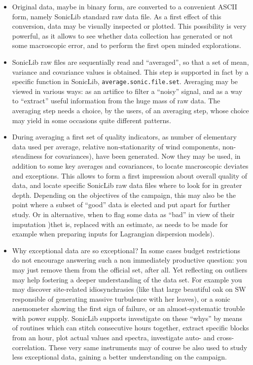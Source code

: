 \documentclass[a4paper,10pt]{book}
\begin{document}
\begin{itemize}
 \item Original data, maybe in binary form, are converted to a convenient ASCII form, namely SonicLib standard raw data file. As a first effect of this conversion, data may be visually inspected or plotted. This possibility is very powerful, as it allows to see whether data collection has generated or not some macroscopic error, and to perform the first open minded explorations.
 \item SonicLib raw files are sequentially read and ``averaged'', so that a set of mean, variance and covariance values is obtained. This step is supported in fact by a specific function in SonicLib, \verb|average.sonic.file.set|. Averaging may be viewed in various ways: as an artifice to filter a ``noisy'' signal, and as a way to ``extract'' useful information from the huge mass of raw data. The averaging step needs a choice, by the users, of an averaging step, whose choice may yield in some occasions quite different patterns.
 \item During averaging a first set of quality indicators, as number of elementary data used per average, relative non-stationarity of wind components, non-steadiness for covariances), have been generated. Now they may be used, in addition to some key averages and covariances, to locate macroscopic deviates and exceptions. This allows to form a first impression about overall quality of data, and locate specific SonicLib raw data files where to look for in greater depth. Depending on the objectives of the campaign, this may also be the point where a subset of ``good'' data is elected and put apart for further study. Or in alternative, when to flag some data as ``bad'' in view of their imputation )thet is, replaced with an estimate, as needs to be made for example when preparing inputs for Lagrangian dispersion models).
 \item Why exceptional data are so exceptional? In some cases budget restrictions do not encourage answering such a non immediately productive question: you may just remove them from the official set, after all. Yet reflecting on outliers may help fostering a deeper understanding of the data set. For example you may discover site-related idiosynchrasies (like that large beautiful oak on SW responsible of generating massive turbulence with her leaves), or a sonic anemometer showing the first sign of failure, or an almost-systematic trouble with power supply. SonicLib supports investigate on these ``whys'' by means of routines which can stitch consecutive hours together, extract specific blocks from an hour, plot actual values and spectra, investigate auto- and cross-correlation. These very same instruments may of course be also used to study less exceptional data, gaining a better understanding on the campaign.

\end{itemize}
\end{document}
